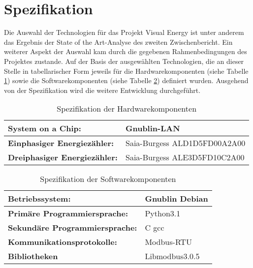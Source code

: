 \documentclass[Bachelorarbeit.tex]{subfiles}
\begin{document}
\newpage

\section{Spezifikation}
Die Auswahl der Technologien für das Projekt Visual Energy ist unter anderem das 
Ergebnis der State of the Art-Analyse des zweiten Zwischenbericht. Ein weiterer 
Aspekt der Auswahl kam durch die gegebenen Rahmenbedingungen des Projektes 
zustande. Auf der Basis der ausgewählten Technologien, die an dieser Stelle in 
tabellarischer Form jeweils für die Hardwarekomponenten (siehe Tabelle \ref{tab:spez_hardware}) sowie die Softwarekomponenten (siehe Tabelle \ref{tab:spez_software}) definiert wurden. Ausgehend von der Spezifikation 
wird die weitere Entwicklung durchgeführt.\\

\begin{table}[h]
\begin{tabular}{|p{40ex}|>{\centering\arraybackslash}p{40ex}|}
\hline 
\rule[0ex]{0pt}{2.5ex} \textbf{System on a Chip:}  & Gnublin-LAN \\ 
\hline 
\rule[0ex]{0pt}{2.5ex} \textbf{Einphasiger Energiezähler:} & Saia-Burgess ALD1D5FD00A2A00 \\ 
\hline 
\rule[0ex]{0pt}{2.5ex} \textbf{Dreiphasiger Energiezähler: } & Saia-Burgess ALE3D5FD10C2A00 \\ 
\hline 
\end{tabular} 
\caption{Spezifikation der Hardwarekomponenten}
\label{tab:spez_hardware}
\end{table}

\begin{table}[h]
\begin{tabular}{|p{40ex}|>{\centering\arraybackslash}p{40ex}|}
\hline 
\rule[0ex]{0pt}{2.5ex} \textbf{Betriebssystem:} & Gnublin Debian \\ 
\hline 
\rule[0ex]{0pt}{2.5ex} \textbf{Primäre Programmiersprache:} & Python3.1 \\ 
\hline 
\rule[0ex]{0pt}{2.5ex} \textbf{Sekundäre Programmiersprache:} & C gcc \\ 
\hline 
\rule[0ex]{0pt}{2.5ex} \textbf{Kommunikationsprotokolle:} & Modbus-RTU \\ 
\hline 
\rule[0ex]{0pt}{2.5ex} \textbf{Bibliotheken} & Libmodbus3.0.5 \\ 
\hline 
\end{tabular} 
\caption{Spezifikation der Softwarekomponenten}
\label{tab:spez_software}
\end{table}
\end{document}
